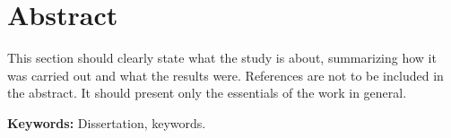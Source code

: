 \newpage

\chapter*{\centering Abstract}
\vspace{-0.2in}

\begin{spacing}{1.5}
\setlength{\parskip}{0.3in}
\setlength{\parindent}{0in}


This section should clearly state what the study is about, summarizing how it was carried out and what the results were. References are not to be included in the abstract. It should present only the essentials of the work in general. 

\par
\textbf{Keywords:} Dissertation, keywords.
\end{spacing}
\newpage
